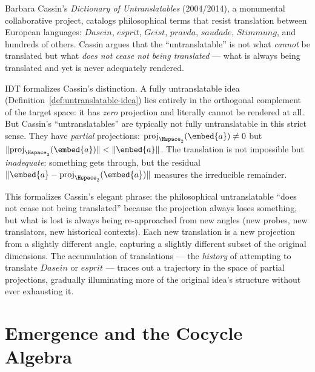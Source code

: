 \begin{interpretation}
\label{interp:ch18:cassin_untranslatables}
Barbara Cassin's \textit{Dictionary of Untranslatables} (2004/2014),
a monumental collaborative project, catalogs philosophical terms that
resist translation between European languages: $Dasein$, $esprit$,
$Geist$, $pravda$, $saudade$, $Stimmung$, and hundreds of others.
Cassin argues that the ``untranslatable'' is not what \emph{cannot} be
translated but what \emph{does not cease not being translated} ---
what is always being translated and yet is never adequately rendered.

IDT formalizes Cassin's distinction.  A fully untranslatable idea
(Definition~\ref{def:untranslatable-idea}) lies entirely in the
orthogonal complement of the target space: it has \emph{zero} projection
and literally cannot be rendered at all.  But Cassin's ``untranslatables''
are typically not fully untranslatable in this strict sense.  They
have \emph{partial} projections: $\text{proj}_{\Hspace_2}(\embed{a}) \neq 0$
but $\|\text{proj}_{\Hspace_2}(\embed{a})\| < \|\embed{a}\|$.  The
translation is not impossible but \emph{inadequate}: something gets through,
but the residual $\|\embed{a} - \text{proj}_{\Hspace_2}(\embed{a})\|$
measures the irreducible remainder.

This formalizes Cassin's elegant phrase: the philosophical
untranslatable ``does not cease not being translated'' because the
projection always loses something, but what is lost is always being
re-approached from new angles (new probes, new translators, new
historical contexts).  Each new translation is a new projection from
a slightly different angle, capturing a slightly different subset of
the original dimensions.  The accumulation of translations ---
the \emph{history} of attempting to translate $Dasein$ or $esprit$ ---
traces out a trajectory in the space of partial projections, gradually
illuminating more of the original idea's structure without ever
exhausting it.
\end{interpretation}



\chapter{Emergence and the Cocycle Algebra}
\label{ch:emergence}

